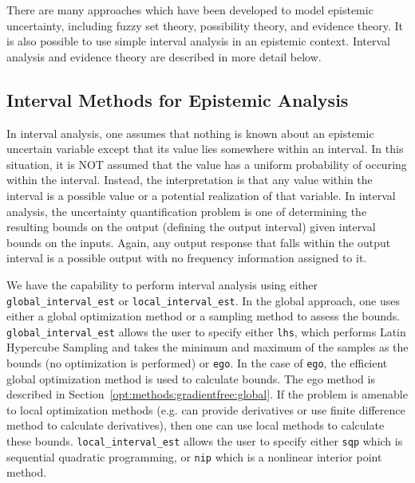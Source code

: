 There are many approaches which have been developed to model epistemic
uncertainty, including fuzzy set theory, possibility theory, and
evidence theory. It is also possible to use simple interval analysis in 
an epistemic context. Interval analysis and evidence theory are 
described in more detail below.

\subsection{Interval Methods for Epistemic Analysis}\label{uq:interval}

In interval analysis, one assumes that nothing is known about 
an epistemic uncertain variable except that its value lies 
somewhere within an interval. In this situation, it is NOT 
assumed that the value has a uniform probability of occuring 
within the interval. Instead, the interpretation is that 
any value within the interval is a possible value or a potential 
realization of that variable. In interval analysis, the 
uncertainty quantification problem is one of determining the 
resulting bounds on the output (defining the output interval) 
given interval bounds on the inputs. Again, any output response 
that falls within the output interval is a possible output 
with no frequency information assigned to it.

We have the capability to perform interval analysis using either
\texttt{global\_interval\_est} or \texttt{local\_interval\_est}.  In
the global approach, one uses either a global optimization method or a
sampling method to assess the bounds.  \texttt{global\_interval\_est}
allows the user to specify either \texttt{lhs}, which performs Latin
Hypercube Sampling and takes the minimum and maximum of the samples as
the bounds (no optimization is performed) or \texttt{ego}. In the case
of \texttt{ego}, the efficient global optimization method is used to
calculate bounds. The ego method is described in
Section~\ref{opt:methods:gradientfree:global}.  If the problem is
amenable to local optimization methods (e.g. can provide derivatives
or use finite difference method to calculate derivatives), then one
can use local methods to calculate these
bounds. \texttt{local\_interval\_est} allows the user to specify
either \texttt{sqp} which is sequential quadratic programming, or
\texttt{nip} which is a nonlinear interior point method.

